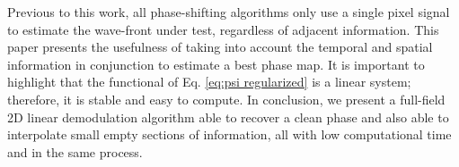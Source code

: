 Previous to this work, all phase-shifting algorithms only use a single pixel
signal to estimate the wave-front under test, regardless of adjacent
information. This paper presents the usefulness of taking into account the
temporal and spatial information in conjunction to estimate a best phase
map. It is important to highlight that the functional of Eq. \eqref{eq:psi
regularized} is a linear system; therefore, it is stable and easy to compute. 
In conclusion, we present a full-field 2D linear demodulation algorithm  able 
to recover a clean phase and also able to interpolate small empty sections of
information, all with low computational time and in the same process.




%
%


  
  
  

  
  
 
 

 
  
  
